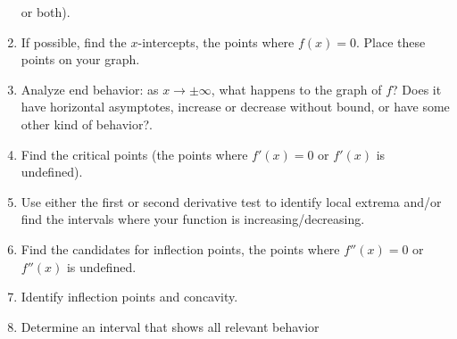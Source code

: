 \documentclass{ximera}
\begin{document}
\begin{problem}
\begin{freeResponse}
\begin{enumerate}
    or both).
  \item If possible, find the $x$-intercepts, the points where $f(x) =
    0$. Place these points on your graph.
  \item Analyze end behavior:  as $x \to \pm \infty$, what happens to the graph of $f$?  Does it  have horizontal asymptotes, increase or decrease without bound, or have some other kind of behavior?.
    \item Find the critical points (the points where $f'(x) = 0$ or
    $f'(x)$ is undefined).
      \item Use either the first or second derivative test to identify local extrema and/or
    find the intervals where your function is increasing/decreasing.
      \item Find the candidates for inflection points, the points where
    $f''(x) = 0$ or $f''(x)$ is undefined.
  \item Identify inflection points and concavity.
  \item Determine an interval that shows all relevant behavior
  \end{enumerate}
  \end{freeResponse}
\end{problem}


%
\end{document}
